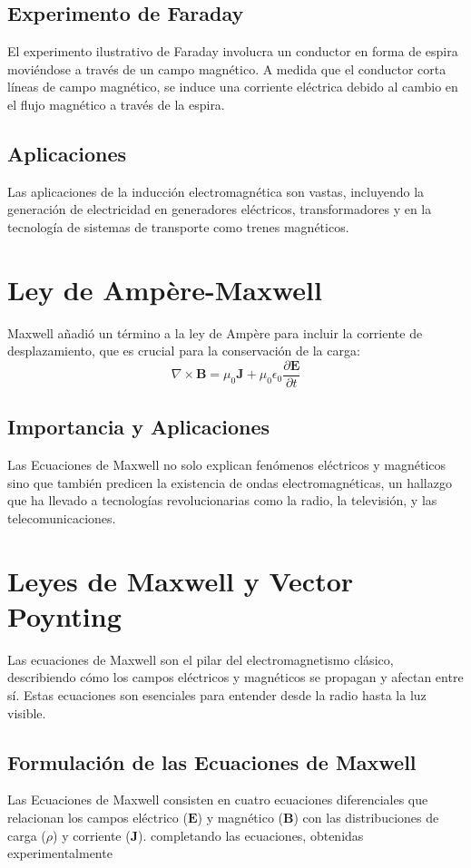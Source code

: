 \documentclass{article}
\begin{document}
	\subsection{Experimento de Faraday}
	El experimento ilustrativo de Faraday involucra un conductor en forma de espira moviéndose a través de un campo magnético. A medida que el conductor corta líneas de campo magnético, se induce una corriente eléctrica debido al cambio en el flujo magnético a través de la espira.
	
	
	\subsection{Aplicaciones}
	Las aplicaciones de la inducción electromagnética son vastas, incluyendo la generación de electricidad en generadores eléctricos, transformadores y en la tecnología de sistemas de transporte como trenes magnéticos.
	
	
	\section{Ley de Ampère-Maxwell}
	Maxwell añadió un término a la ley de Ampère para incluir la corriente de desplazamiento, que es crucial para la conservación de la carga:
	\begin{equation}
		\nabla \times \mathbf{B} = \mu_0 \mathbf{J} + \mu_0 \epsilon_0 \frac{\partial \mathbf{E}}{\partial t}
	\end{equation}
	
	\subsection{Importancia y Aplicaciones}
	Las Ecuaciones de Maxwell no solo explican fenómenos eléctricos y magnéticos sino que también predicen la existencia de ondas electromagnéticas, un hallazgo que ha llevado a tecnologías revolucionarias como la radio, la televisión, y las telecomunicaciones.
	
	
	
	
	\section{Leyes de Maxwell y Vector Poynting}
	Las ecuaciones de Maxwell son el pilar del electromagnetismo clásico, describiendo cómo los campos eléctricos y magnéticos se propagan y afectan entre sí. Estas ecuaciones son esenciales para entender desde la radio hasta la luz visible.
	
	\subsection{Formulación de las Ecuaciones de Maxwell}
	Las Ecuaciones de Maxwell consisten en cuatro ecuaciones diferenciales que relacionan los campos eléctrico (\(\mathbf{E}\)) y magnético (\(\mathbf{B}\)) con las distribuciones de carga (\(\rho\)) y corriente (\(\mathbf{J}\)).
	completando las ecuaciones, obtenidas experimentalmente
	
\end{document}
